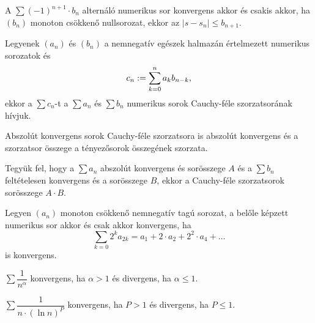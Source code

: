 \begin{theorem}
  A $\sum  (-1)^{n+1} \cdot b_n$ alternáló numerikus sor konvergens akkor és
  csakis akkor, ha $(b_n)$ monoton csökkenő nullsorozat, ekkor az $|s - s_n|
    \leq b_{n + 1}$.
\end{theorem}

\begin{definition}[TODO]
  Legyenek $(a_n)$ és $(b_n)$ a nemnegatív egészek halmazán értelmezett
  numerikus sorozatok és
  \vspace{-.75em}
  \[
    c_n:=\sum_{k=0}^n a_k b_{n-k}
    \text,
  \]
  ekkor a $\sum c_n$-t a $\sum a_n$ és $\sum b_n$ numerikus sorok Cauchy-féle
  szorzatsorának hívjuk.
\end{definition}

\begin{theorem}
  Abszolút konvergens sorok Cauchy-féle szorzatsora is abszolút konvergens és
  a szorzatsor összege a tényezősorok összegének szorzata.
\end{theorem}

\begin{theorem}
  Tegyük fel, hogy a $\sum a_n$ abszolút konvergens és sorösszege $A$ és a
  $\sum b_n$ feltételesen konvergens és a sorösszege $B$, ekkor a Cauchy-féle
  szorzatsorok sorösszege $A\cdot B$.
\end{theorem}





\begin{theorem}[TODO]
  Legyen $(a_n)$ monoton csökkenő nemnegatív tagú sorozat, a belőle képzett
  numerikus sor akkor és csak akkor konvergens, ha
  \[
    \sum_{k = 0} 2^k a_{2k} =
    a_1 + 2 \cdot a_2 + 2^2 \cdot a_4 + \dots
  \]
  is konvergens.
\end{theorem}

\begin{statement}
  $\displaystyle \sum \dfrac{1}{n^\alpha}$ konvergens, ha $\alpha > 1$ és
  divergens, ha $\alpha \leq 1$.
\end{statement}

\begin{statement}
  $\displaystyle \sum \dfrac{1}{n \cdot (\ln n)^P}$ konvergens, ha $P>1$ és
  divergens, ha $P \leq 1$.
\end{statement}